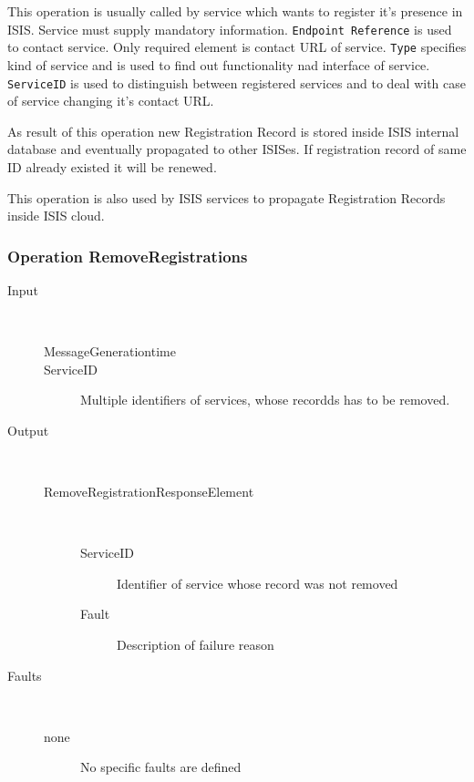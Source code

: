 \documentclass{book}
\begin{document}
This operation is usually called by service which wants to register it's presence in ISIS. Service must supply mandatory information. \texttt{Endpoint Reference} is used to contact service. Only required element is contact URL of service. \texttt{Type} specifies kind of service and is used to find out functionality nad interface of service. \texttt{ServiceID} is used to distinguish between registered services and to deal with case of service changing it's contact URL.

As result of this operation new Registration Record is stored inside ISIS internal database and eventually propagated to other ISISes. If registration record of same ID already existed it will be renewed.

This operation is also used by ISIS services to propagate Registration Records inside ISIS cloud.

\subsubsection{Operation RemoveRegistrations}

\begin{description}

  \item[Input]~\begin{description}
    \item[MessageGenerationtime]
    \item[ServiceID] Multiple identifiers of services, whose recordds has to be removed.
  \end{description}

  \item[Output]~\begin{description}
    \item[RemoveRegistrationResponseElement]~\begin{description}
      \item[ServiceID] Identifier of service whose record was not removed
      \item[Fault] Description of failure reason
    \end{description}
  \end{description}

  \item[Faults]~\begin{description}
    \item[none]No specific faults are defined
  \end{description}

\end{description}
\end{document}
